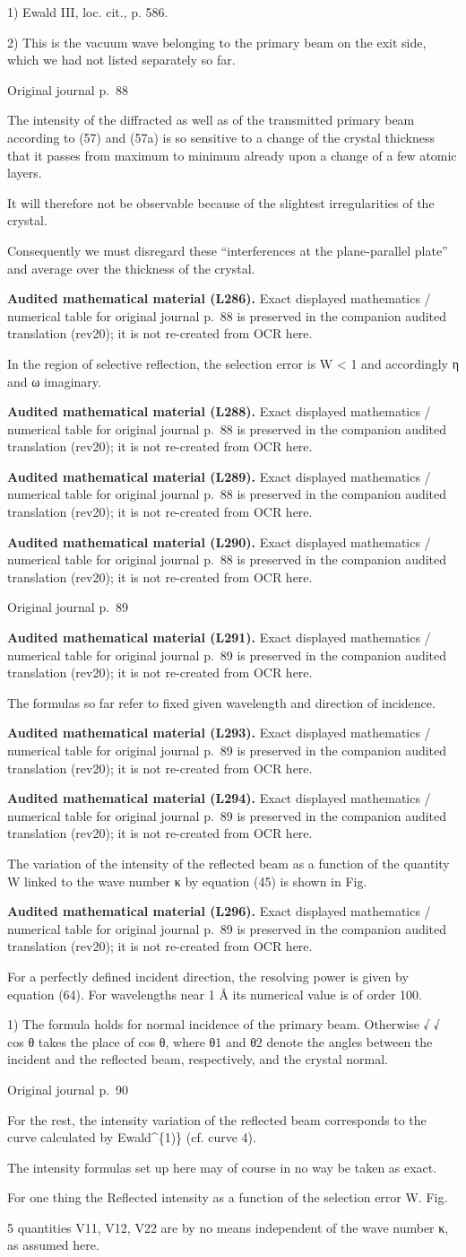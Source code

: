 \documentclass[10pt]{article}
\newcommand{\origpage}[1]{\par\medskip\noindent\hfill{\small\color{notegray}Original journal p.~#1}\hfill\mbox{}\par\smallskip}
\newcommand{\mathref}[2]{\par\smallskip\noindent\colorbox{gray!8}{\parbox{0.95\linewidth}{\small\color{notegray}\textbf{Audited mathematical material (L#1).} Exact displayed mathematics / numerical table for original journal p.~#2 is preserved in the companion audited translation (rev20); it is not re-created from OCR here.}}\par\smallskip}
\begin{document}
\noindent\footnotesize 1) Ewald III, loc. cit., p. 586.\par\normalsize
\noindent\footnotesize 2) This is the vacuum wave belonging to the primary beam on the exit side, which we had not listed separately so far.\par\normalsize
\origpage{88}
The intensity of the diffracted as well as of the transmitted primary beam according to (57) and (57a) is so sensitive to a change of the crystal thickness that it passes from maximum to minimum already upon a change of a few atomic layers.\par
It will therefore not be observable because of the slightest irregularities of the crystal.\par
Consequently we must disregard these “interferences at the plane-parallel plate” and average over the thickness of the crystal.\par
\mathref{286}{88}
In the region of selective reflection, the selection error is W < 1 and accordingly η and ω imaginary.\par
\mathref{288}{88}
\mathref{289}{88}
\mathref{290}{88}
\origpage{89}
\mathref{291}{89}
The formulas so far refer to fixed given wavelength and direction of incidence.\par
\mathref{293}{89}
\mathref{294}{89}
The variation of the intensity of the reflected beam as a function of the quantity W linked to the wave number κ by equation (45) is shown in Fig.\par
\mathref{296}{89}
For a perfectly defined incident direction, the resolving power is given by equation (64). For wavelengths near 1 Å its numerical value is of order 100.\par
\noindent\footnotesize 1) The formula holds for normal incidence of the primary beam. Otherwise √ √ cos θ takes the place of cos θ, where θ1 and θ2 denote the angles between the incident and the reflected beam, respectively, and the crystal normal.\par\normalsize
\origpage{90}
For the rest, the intensity variation of the reflected beam corresponds to the curve calculated by Ewald\textasciicircum{}\{1)\} (cf. curve 4).\par
The intensity formulas set up here may of course in no way be taken as exact.\par
For one thing the Reflected intensity as a function of the selection error W. Fig.\par
5 quantities V11, V12, V22 are by no means independent of the wave number κ, as assumed here.\par
\end{document}
